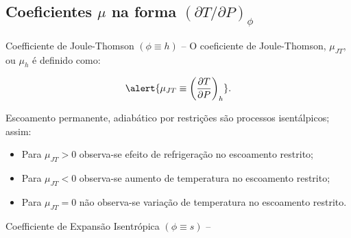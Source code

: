 \subsection{Coeficientes $\mu$ na forma $(\partial T/\partial P)_{\phi}$}

    \begin{frame}[allowframebreaks]{Coefficiente de Joule-Thomson $(\phi \equiv h)$ --}
        O coeficiente de Joule-Thomson, \alert{$\mu_{JT}$}, ou $\mu_h$ é definido como:

        \begin{equation*}
            \alert{
                \mu_{JT} \equiv \left(\frac{\partial T}{\partial P}\right)_h
            }.
        \end{equation*} \vspace*\medskipamount

        Escoamento \alert{permanente}, \alert{adiabático} por \alert{restrições} são processos
        \alert{isentálpicos}; assim: \vspace*\medskipamount

        \begin{itemize}
            \item Para \alert{$\mu_{JT} > 0$} observa-se efeito de \alert{refrigeração} no
                escoamento restrito;
            \item Para \alert{$\mu_{JT} < 0$} observa-se \alert{aumento de temperatura} no
                escoamento restrito;
            \item Para \alert{$\mu_{JT} = 0$} não observa-se \alert{variação de temperatura} no
                escoamento restrito.
        \end{itemize}

    \end{frame}

    \begin{frame}[allowframebreaks]{Coefficiente de Expansão Isentrópica $(\phi \equiv s)$ --}
    \end{frame}

